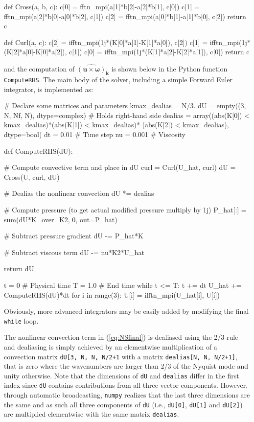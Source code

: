 \documentclass[11pt, oneside]{article}
\newcommand{\inpyth}{\lstinline[style=pythonstyle, basicstyle=\ttfamily]} %[]%
\begin{document}
\begin{python}
def Cross(a, b, c):
    c[0] = fftn_mpi(a[1]*b[2]-a[2]*b[1], c[0])
    c[1] = fftn_mpi(a[2]*b[0]-a[0]*b[2], c[1])
    c[2] = fftn_mpi(a[0]*b[1]-a[1]*b[0], c[2])
    return c

def Curl(a, c):
    c[2] = ifftn_mpi(1j*(K[0]*a[1]-K[1]*a[0]), c[2])
    c[1] = ifftn_mpi(1j*(K[2]*a[0]-K[0]*a[2]), c[1])
    c[0] = ifftn_mpi(1j*(K[1]*a[2]-K[2]*a[1]), c[0])
    return c

\end{python}
and the computation of $\widehat{( \bm{u} \times \bm{\omega})}_{\bm{k}}$ is shown below in the Python function \inpyth{ComputeRHS}. The main body of the solver, including a simple Forward Euler integrator, is implemented as:
\begin{python}
# Declare some matrices and parameters
kmax_dealias = N/3.
dU = empty((3, N, Nf, N), dtype=complex)  # Holds right-hand side
dealias = array((abs(K[0]) < kmax_dealias)*(abs(K[1]) < kmax_dealias)*
                (abs(K[2]) < kmax_dealias), dtype=bool)
dt = 0.01    # Time step
nu = 0.001   # Viscosity

def ComputeRHS(dU):

    # Compute convective term and place in dU
    curl = Curl(U_hat, curl)
    dU = Cross(U, curl, dU)

    # Dealias the nonlinear convection
    dU *= dealias

    # Compute pressure (to get actual modified pressure multiply by 1j)
    P_hat[:] = sum(dU*K_over_K2, 0, out=P_hat)

    # Subtract pressure gradient
    dU -= P_hat*K

    # Subtract viscous term
    dU -= nu*K2*U_hat

    return dU

t = 0        # Physical time
T = 1.0      # End time
while t <= T:
    t += dt
    U_hat += ComputeRHS(dU)*dt
    for i in range(3):
        U[i] = ifftn_mpi(U_hat[i], U[i])

\end{python}
Obviously, more advanced integrators may be easily added by modifying the final \inpyth{while} loop. 

The nonlinear convection term in (\ref{eq:NSfinal}) is dealiased using the 2/3-rule and dealiasing is simply achieved by an elementwise multiplication of a convection matrix \inpyth{dU[3, N, N, N/2+1} with a matrix \inpyth{dealias[N, N, N/2+1]}, that is zero where the wavenumbers are larger than 2/3 of the Nyquist mode and unity otherwise. Note that the dimensions of \inpyth{dU} and \inpyth{dealias} differ in the first index since \inpyth{dU} contains contributions from all three vector components. However, through automatic broadcasting, \texttt{numpy} realizes that the last three dimensions are the same and as such all three components of \inpyth{dU} (i.e.,  \inpyth{dU[0]}, \inpyth{dU[1]} and  \inpyth{dU[2]}) are multiplied elementwise with the same matrix \inpyth{dealias}. 
\end{document}
